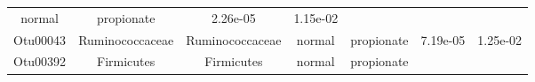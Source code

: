 \documentclass[11pt,]{article}
\begin{document}
\begin{longtable}[]{@{}ccccccc@{}}
\begin{minipage}[t]{0.09\columnwidth}
normal\strut
\end{minipage} & \begin{minipage}[t]{0.11\columnwidth}\centering\strut
propionate\strut
\end{minipage} & \begin{minipage}[t]{0.09\columnwidth}\centering\strut
2.26e-05\strut
\end{minipage} & \begin{minipage}[t]{0.09\columnwidth}\centering\strut
1.15e-02\strut
\end{minipage}\tabularnewline
\begin{minipage}[t]{0.09\columnwidth}\centering\strut
Otu00043\strut
\end{minipage} & \begin{minipage}[t]{0.17\columnwidth}\centering\strut
Ruminococcaceae\strut
\end{minipage} & \begin{minipage}[t]{0.17\columnwidth}\centering\strut
Ruminococcaceae\strut
\end{minipage} & \begin{minipage}[t]{0.09\columnwidth}\centering\strut
normal\strut
\end{minipage} & \begin{minipage}[t]{0.11\columnwidth}\centering\strut
propionate\strut
\end{minipage} & \begin{minipage}[t]{0.09\columnwidth}\centering\strut
7.19e-05\strut
\end{minipage} & \begin{minipage}[t]{0.09\columnwidth}\centering\strut
1.25e-02\strut
\end{minipage}\tabularnewline
\begin{minipage}[t]{0.09\columnwidth}\centering\strut
Otu00392\strut
\end{minipage} & \begin{minipage}[t]{0.17\columnwidth}\centering\strut
Firmicutes\strut
\end{minipage} & \begin{minipage}[t]{0.17\columnwidth}\centering\strut
Firmicutes\strut
\end{minipage} & \begin{minipage}[t]{0.09\columnwidth}\centering\strut
normal\strut
\end{minipage} & \begin{minipage}[t]{0.11\columnwidth}\centering\strut
propionate\strut
\end{minipage} & \begin{minipage}[t]{0.09\columnwidth}\centering\strut

\end{minipage}
\end{longtable}
\end{document}
